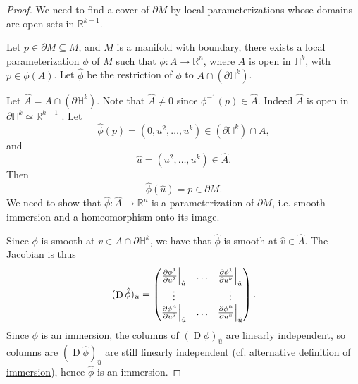 \documentclass[notoc,notitlepage]{tufte-book}
\DeclareMathOperator{\D}{D}
\begin{document}
\begin{proof}
  We need to find a cover of $\partial M$ by local parameterizations whose
  domains are open sets in $\mathbb{R}^{k-1}$.

  Let $p \in \partial M \subseteq M$, and $M$ is a manifold with boundary, there
  exists a local parameterization $\phi$ of $M$ such that $\phi : A \to
  \mathbb{R}^n$, where $A$ is open in $\mathbb{H}^k$, with $p \in \phi(A)$. Let
  $\hat{\phi}$ be the restriction of $\phi$ to $A \cap (\partial
  \mathbb{H}^k)$.

  Let $\hat{A} = A \cap (\partial \mathbb{H}^k)$. Note that $\hat{A} \neq 0$ 
  since $\phi^{-1}(p) \in \hat{A}$. Indeed $\hat{A}$ is open in $\partial
  \mathbb{H}^k \simeq \mathbb{R}^{k-1}$ . Let
  \begin{equation*}
    \hat{\phi}(p) = (0, u^2, \ldots, u^k) \in (\partial \mathbb{H}^k) \cap A,
  \end{equation*}
  and
  \begin{equation*}
    \hat{u} = (u^2, \ldots, u^k) \in \hat{A}.
  \end{equation*}
  Then
  \begin{equation*}
    \hat{\phi}(\hat{u}) = p \in \partial M.
  \end{equation*}
  We need to show that $\hat{\phi} : \hat{A} \to \mathbb{R}^n$ is a
  parameterization of $\partial M$, i.e. smooth immersion and a homeomorphism
  onto its image.

  Since $\phi$ is smooth at $v \in A \cap \partial \mathbb{H}^k$, we have that
  $\hat{\phi}$ is smooth at $\hat{v} \in \hat{A}$. The Jacobian is thus
  \begin{equation*}
    (\D \hat{\phi})_{\hat{u}} = \begin{pmatrix}
      \frac{\partial \phi^1}{\partial u^2} \at{\hat{u}}{} & \hdots &
      \frac{\partial \phi^1}{\partial u^k}
      \at{\hat{u}}{} \\
      \vdots & & \vdots \\
      \frac{\partial \phi^n}{\partial u^2} \at{\hat{u}}{} & \hdots &
      \frac{\partial \phi^n}{\partial u^k} \at{\hat{u}}{}
    \end{pmatrix}.
  \end{equation*}
  Since $\phi$ is an immersion, the columns of $(\D \phi)_{\hat{u}}$ are
  linearly independent, so columns are $(\D \hat{\phi})_{\hat{u}}$ are still
  linearly independent (cf. alternative definition of
  \hyperref[defn:immersion]{immersion}), hence $\hat{\phi}$ is an immersion.


\end{proof}
\end{document}

